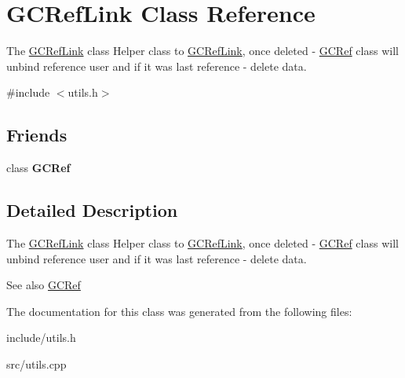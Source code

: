 \hypertarget{classGCRefLink}{}\section{G\+C\+Ref\+Link Class Reference}
\label{classGCRefLink}


The \hyperlink{classGCRefLink}{G\+C\+Ref\+Link} class Helper class to \hyperlink{classGCRefLink}{G\+C\+Ref\+Link}, once deleted -\/ \hyperlink{classGCRef}{G\+C\+Ref} class will unbind reference user and if it was last reference -\/ delete data.  




{\ttfamily \#include $<$utils.\+h$>$}

\subsection*{Friends}
\begin{DoxyCompactItemize}
\item 
\hypertarget{classGCRefLink_a85a14a8d83e08e75d136a7adf7d8da1d}{}class {\bfseries G\+C\+Ref}\label{classGCRefLink_a85a14a8d83e08e75d136a7adf7d8da1d}

\end{DoxyCompactItemize}


\subsection{Detailed Description}
The \hyperlink{classGCRefLink}{G\+C\+Ref\+Link} class Helper class to \hyperlink{classGCRefLink}{G\+C\+Ref\+Link}, once deleted -\/ \hyperlink{classGCRef}{G\+C\+Ref} class will unbind reference user and if it was last reference -\/ delete data. 

\begin{DoxySeeAlso}{See also}
\hyperlink{classGCRef}{G\+C\+Ref} 
\end{DoxySeeAlso}


The documentation for this class was generated from the following files\+:\begin{DoxyCompactItemize}
\item 
include/utils.\+h\item 
src/utils.\+cpp\end{DoxyCompactItemize}
